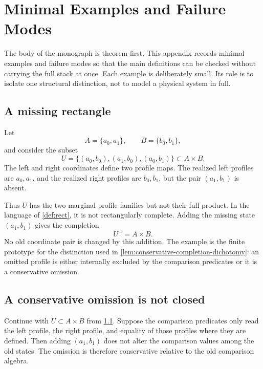 \chapter{Minimal Examples and Failure Modes}
\label{app:minimal-examples}
\begin{chapterorientation}
\end{chapterorientation}

The body of the monograph is theorem-first.  This appendix records
minimal examples and failure modes so that the main definitions can be
checked without carrying the full stack at once.  Each example is
deliberately small.  Its role is to isolate one structural distinction,
not to model a physical system in full.

\section{A missing rectangle}
\label{app:example-missing-rectangle}
Let
\[
	A=\{a_0,a_1\},\qquad B=\{b_0,b_1\},
\]
and consider the subset
\[
	U=\{(a_0,b_0),(a_1,b_0),(a_0,b_1)\}\subset A\times B.
\]
The left and right coordinates define two profile maps.  The realized
left profiles are \(a_0,a_1\), and the realized right profiles are
\(b_0,b_1\), but the pair \((a_1,b_1)\) is absent.

Thus \(U\) has the two marginal profile families but not their full
product.  In the language of \cref{def:rect}, it is not rectangularly
complete.  Adding the missing state \((a_1,b_1)\) gives the completion
\[
	U^{+}=A\times B.
\]
No old coordinate pair is changed by this addition.  The example is the
finite prototype for the distinction used in
\cref{lem:conservative-completion-dichotomy}: an omitted profile is
either internally excluded by the comparison predicates or it is a
conservative omission.

\section{A conservative omission is not closed}
\label{app:example-conservative-omission}
Continue with \(U\subset A\times B\) from
\cref{app:example-missing-rectangle}.  Suppose the comparison predicates
only read the left profile, the right profile, and equality of those
profiles where they are defined.  Then adding \((a_1,b_1)\) does not
alter the comparison values among the old states.  The omission is
therefore conservative relative to the old comparison algebra.

